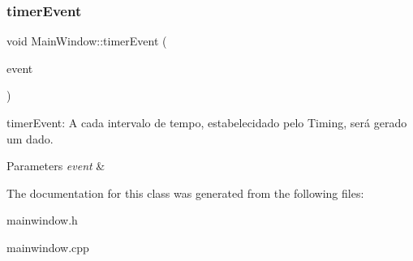 \subsubsection{\texorpdfstring{timer\+Event}{timerEvent}}
{\footnotesize\ttfamily void Main\+Window\+::timer\+Event (\begin{DoxyParamCaption}\item[{Q\+Timer\+Event $\ast$}]{event }\end{DoxyParamCaption})\hspace{0.3cm}{\ttfamily [slot]}}



timer\+Event\+: A cada intervalo de tempo, estabelecidado pelo Timing, será gerado um dado. 


\begin{DoxyParams}{Parameters}
{\em event} & \\
\hline
\end{DoxyParams}


The documentation for this class was generated from the following files\+:\begin{DoxyCompactItemize}
\item 
mainwindow.\+h\item 
mainwindow.\+cpp\end{DoxyCompactItemize}
